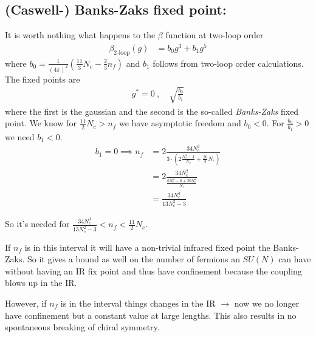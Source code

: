 \subsection{(Caswell-) Banks-Zaks fixed point:} It is worth nothing what happens to the $\beta$ function at two-loop order 
\begin{align}
    \beta_{\text{2-loop}}(g) &= b_0 g^3 + {b_1 g^5}
\end{align}
where $b_0={\frac{1}{(4\pi)^2} \left(\frac{11}{3}N_c - \frac{2}{3}n_f\right)}$ and $b_1$ follows from two-loop order calculations.
The fixed points are
\begin{align*}
    g^* = 0 \ , \quad \sqrt{\frac{b_0}{b_1}}
\end{align*}
where the first is the gaussian and the second is the so-called \textit{Banks-Zaks} fixed point. 
We know for $\frac{11}{2}N_c > n_f$ we have asymptotic freedom and $b_0 < 0$. For $\frac{b_0}{b_1} > 0$ we need $b_1 < 0$.
\begin{align*}
    b_1 = 0 \implies n_f &= 2 \frac{34 N_c^2}{3 \cdot \left( 2 \frac{N_c^2 - 1}{N_c} + \frac{20}{3} N_c \right)} \\
    &= 2 \frac{34 N_c^2}{\frac{6N_c^2 - 6 + 20N_c^2}{N_c}} \\
    &= \frac{34 N_c^3}{13 N_c^2 - 3}
\end{align*}

\noindent So it's needed for $\frac{34 N_c^3}{13 N_c^2 - 3} < n_f < \frac{11}{2}N_c$. 

\vspace{1em}
\noindent If $n_f$ is in this interval it will have a non-trivial infrared fixed point the Banks-Zaks. So it gives a bound as well on the number of fermions an $SU(N)$ can have without having an IR fix point and thus have confinement because the coupling blows up in the IR. 

\vspace{1em}
\noindent However, if $n_f$ is in the interval things changes in the IR $\rightarrow$ now we no longer have confinement but a constant value at large lengths. This also results in no spontaneous breaking of chiral symmetry.